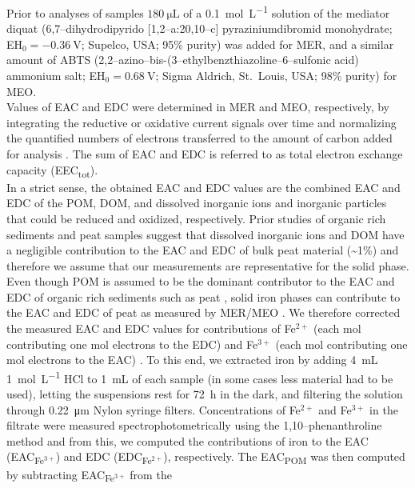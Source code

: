 \documentclass[draft,linenumbers]{agujournal2018}
\begin{document}
Prior to analyses of samples \(\SI{180}{\micro\L}\) of a
\SI{0.1}{\mol\per\L} solution of the mediator diquat
(6,7--dihydrodipyrido {[}1,2--a:20,10--c{]} pyraziniumdibromid
monohydrate; EH\(_0=\SI{-0.36}{\V}\); Supelco, USA; 95\% purity) was
added for MER, and a similar amount of ABTS
(2,2--azino--bis-(3--ethylbenzthiazoline--6--sulfonic acid) ammonium
salt; EH\(_0=\SI{+0.68}{\V}\); Sigma Aldrich, St.~Louis, USA; 98\%
purity) for MEO.\\
Values of EAC and EDC were determined in MER and MEO, respectively, by
integrating the reductive or oxidative current signals over time and
normalizing the quantified numbers of electrons transferred to the
amount of carbon added for analysis \citep{Aeschbacher.2010}. The sum of
EAC and EDC is referred to as total electron exchange capacity
(EEC\textsubscript{tot}).\\
In a strict sense, the obtained EAC and EDC values are the combined EAC
and EDC of the POM, DOM, and dissolved inorganic ions and inorganic
particles that could be reduced and oxidized, respectively. Prior
studies of organic rich sediments and peat samples suggest that
dissolved inorganic ions and DOM have a negligible contribution to the
EAC and EDC of bulk peat material (\textasciitilde1\%)
\citep{Lau.2015, Gao.2019} and therefore we assume that our measurements
are representative for the solid phase.\\
Even though POM is assumed to be the dominant contributor to the EAC and
EDC of organic rich sediments such as peat \citep{Lau.2015, Gao.2019},
solid iron phases can contribute to the EAC and EDC of peat as measured
by MER/MEO \citep{Lau.2015}. We therefore corrected the measured EAC and
EDC values for contributions of Fe\(^{2+}\) (each mol contributing one
mol electrons to the EDC) and Fe\(^{3+}\) (each mol contributing one mol
electrons to the EAC) \citep{Lau.2015, Gao.2019}. To this end, we
extracted iron by adding \SI{4}{\milli\liter} \SI{1}{\mol\per\L} HCl to
\SI{1}{\milli\liter} of each sample (in some cases less material had to
be used), letting the suspensions rest for \SI{72}{\hour} in the dark,
and filtering the solution through \SI{0.22}{\micro\meter} Nylon syringe
filters. Concentrations of Fe\(^{2+}\) and Fe\(^{3+}\) in the filtrate
were measured spectrophotometrically using the 1,10--phenanthroline
method \citep{Tamura.1974} and from this, we computed the contributions
of iron to the EAC (EAC\textsubscript{Fe$^{3+}$}) and EDC
(EDC\textsubscript{Fe$^{2+}$}), respectively. The EAC\textsubscript{POM}
was then computed by subtracting EAC\textsubscript{Fe$^{3+}$} from the
\end{document}
